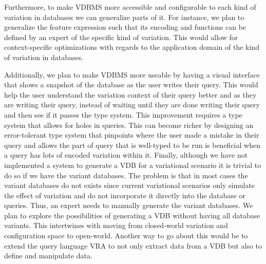 %
Furthermore, to make VDBMS more accessible and configurable to each 
kind of variation in databases we can generalize parts of it. For instance, 
we plan to generalize the feature expression such that its encoding and functions
can be defined by an expert of the specific kind of variation. This would allow
for context-specific optimizations with regards to the application domain 
of the kind of variation in databases.

%
Additionally, we plan to make VDBMS more useable by having a visual 
interface that shows a snapshot of the database as the user writes their
query. This would help the user understand the variation context of their 
query better and as they are writing their query, instead of waiting until 
they are done writing their query and then see if it passes the type system.
%
This improvement requires a type system that allows for holes in queries.
This can become richer by 
designing an error-tolerant type system that pinpoints
where the user made a mistake in their query and allows the part of
query that is well-typed to be run is beneficial when a query has lots of 
encoded variation within it. 
%
Finally, although we have not implemented a system to generate a VDB for 
a variational scenario it is trivial to do so if we have the variant databases.
The problem is that in most cases the variant databases do not exists
since current variational scenarios only simulate the effect of variation
and do not incorporate it directly into the database or queries.
Thus, an expert needs to manually generate the variant databases.
%
We plan to explore the possibilities of generating a VDB without 
having all database variants. This intertwines with moving from closed-world
variation and configuration space to open-world. 
%
Another way to go about this would be to extend the query language VRA 
to not only extract data from a VDB but also to define and manipulate data. 



